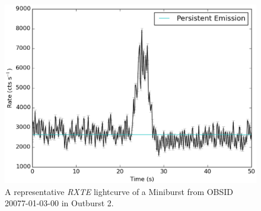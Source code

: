 \begin{figure}
  \centering
  \includegraphics[width=.9\linewidth, trim={0cm 0 0cm 0},clip]{images/mini.eps}
  \caption[A representative \textit{RXTE} lightcurve of a Miniburst.]{\small  A representative \textit{RXTE} lightcurve of a Miniburst from OBSID 20077-01-03-00 in Outburst 2.}
  \label{fig:a_mini}
\end{figure}
